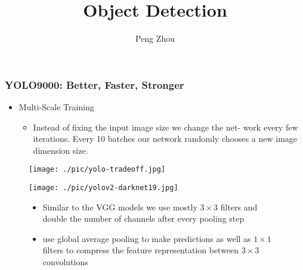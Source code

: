 \documentclass{beamer}
\begin{document}
\title{Object Detection}
\author{Peng Zhou}
\maketitle{}

\begin{frame}
  \frametitle{YOLO9000: Better, Faster, Stronger}
  \begin{itemize}
  \item Multi-Scale Training
    \begin{itemize}
    \item Instead of fixing the input image size we change the net- work every few
      iterations. Every 10 batches our network randomly chooses a new image
      dimension size.
    \end{itemize}
  \end{itemize}
  \begin{figure}[!htb]
    \centering
    \texttt{[image: ./pic/yolo-tradeoff.jpg]}
  \end{figure}
\end{frame}

\begin{frame}

  \begin{figure}[ht]
    \centering
    \begin{minipage}{.6\textwidth}
      \centering
      \texttt{[image: ./pic/yolov2-darknet19.jpg]}
    \end{minipage}%
    \begin{minipage}{.4\textwidth}
      \begin{itemize}
      \item Similar to the VGG models we use mostly $3\times3$ filters and
        double the number of channels after every pooling step
      \item use global average pooling to make predictions as well as $1\times1$
        filters to compress the feature representation between $3\times3$
        convolutions
      \end{itemize}
    \end{minipage}
  \end{figure}


\end{frame}
\end{document}
